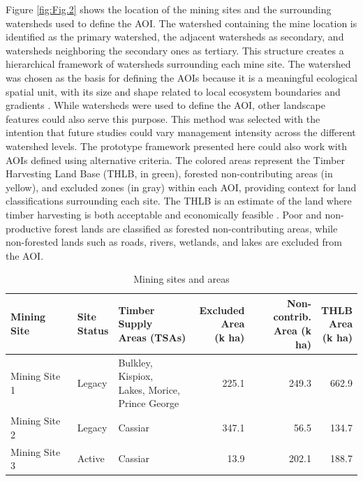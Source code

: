 \documentclass[preprint,12pt]{elsarticle}
\begin{document}
Figure \ref{fig:Fig.2} shows the location of the mining sites and the surrounding watersheds used to define the AOI. The watershed containing the mine location is identified as the primary watershed, the adjacent watersheds as secondary, and watersheds neighboring the secondary ones as tertiary. This structure creates a hierarchical framework of watersheds surrounding each mine site. The watershed was chosen as the basis for defining the AOIs because it is a meaningful ecological spatial unit, with its size and shape related to local ecosystem boundaries and gradients \citep{flotemersch2016watershed}. While watersheds were used to define the AOI, other landscape features could also serve this purpose. This method was selected with the intention that future studies could vary management intensity across the different watershed levels. The prototype framework presented here could also work with AOIs defined using alternative criteria. The colored areas represent the Timber Harvesting Land Base (THLB, in green), forested non-contributing areas (in yellow), and excluded zones (in gray) within each AOI, providing context for land classifications surrounding each site. The THLB is an estimate of the land where timber harvesting is both acceptable and economically feasible \citep{bcgov2025}. Poor and non-productive forest lands are classified as forested non-contributing areas, while non-forested lands such as roads, rivers, wetlands, and lakes are excluded from the AOI.

\begin{table}[H]
\centering
\caption{Mining sites and areas}
\label{tab:area}
\begin{adjustbox}{width=\textwidth}
{\small
\begin{tabular}{lllrrr}
\toprule
\makecell[l]{Mining\\Site} & 
\makecell[l]{Site\\Status} & 
\makecell[l]{Timber\\Supply\\Areas (TSAs)} & 
\makecell[r]{Excluded\\Area\\(k ha)} & 
\makecell[r]{Non-\\contrib.\\Area (k ha)} & 
\makecell[r]{THLB\\Area\\(k ha)} \\
\midrule
Mining Site 1 & Legacy & \makecell[l]{Bulkley, Kispiox,\\ Lakes, Morice,\\ Prince George} & 225.1 & 249.3 & 662.9 \\
Mining Site 2 & Legacy & Cassiar & 347.1 & 56.5 & 134.7 \\
Mining Site 3 & Active & Cassiar & 13.9 & 202.1 & 188.7 \\
\bottomrule
\end{tabular}
}
\end{adjustbox}
\end{table}
\end{document}
